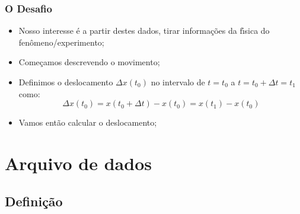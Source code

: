 \documentclass[notes=show]{beamer}
\begin{document}
\begin{frame}%

\frametitle{O Desafio}

\begin{itemize}
\item Nosso interesse \'{e} a partir destes dados, tirar informa\c{c}\~{o}es
da f\'{\i}sica do fen\^{o}meno/experimento;

\item Come\c{c}amos descrevendo o movimento;

\item Definimos o deslocamento $\Delta x(t_{0})$ no intervalo de $t=t_{0}$ a 
$t=t_{0}+\Delta t=t_{1}$ como:%
\[
\Delta x(t_{0})=x(t_{0}+\Delta t)-x(t_{0})=x(t_{1})-x(t_{0})
\]
\item Vamos então calcular o deslocamento;
\end{itemize}

\transboxout%
\end{frame}%



\section{Arquivo de dados}

\subsection{Defini\c{c}\~{a}o}
\end{document}
